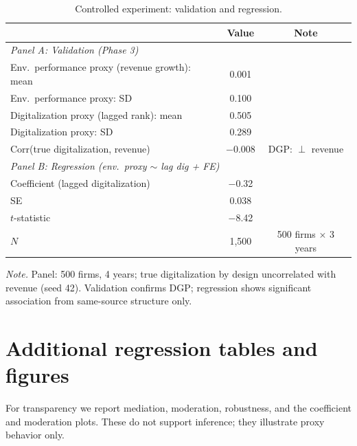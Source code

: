 \documentclass[3p,times,sort&compress]{elsarticle}
\begin{document}
\begin{table}[htbp]
  \centering
  \caption{Controlled experiment: validation and regression.}
  \label{tab:synthetic-validation}
  \small
  \begin{tabularx}{\textwidth}{@{}Xcc@{}}
    \toprule
    & Value & Note \\
    \midrule
    \multicolumn{3}{l}{\textit{Panel A: Validation (Phase 3)}} \\
    Env.\ performance proxy (revenue growth): mean & 0.001 & \\
    Env.\ performance proxy: SD & 0.100 & \\
    Digitalization proxy (lagged rank): mean & 0.505 & \\
    Digitalization proxy: SD & 0.289 & \\
    Corr(true digitalization, revenue) & $-$0.008 & DGP: $\perp$ revenue \\
    \midrule
    \multicolumn{3}{l}{\textit{Panel B: Regression (env.\ proxy $\sim$ lag dig + FE)}} \\
    Coefficient (lagged digitalization) & $-$0.32 & \\
    SE & 0.038 & \\
    $t$-statistic & $-$8.42 & \\
    $N$ & 1,500 & 500 firms $\times$ 3 years \\
    \bottomrule
  \end{tabularx}
  \medskip
  \parbox{\textwidth}{\raggedright\footnotesize\textit{Note.} Panel: 500 firms, 4 years; true digitalization by design uncorrelated with revenue (seed 42). Validation confirms DGP; regression shows significant association from same-source structure only.}
\end{table}




\appendix
\renewcommand{\thesection}{Appendix~\Alph{section}}
\section{Additional regression tables and figures}
\label{app:extra-tables}

For transparency we report mediation, moderation, robustness, and the coefficient and moderation plots. These do not support inference; they illustrate proxy behavior only.
\end{document}
